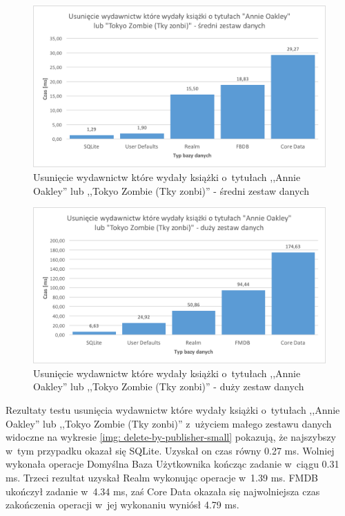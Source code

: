 \begin{figure}[H]
    \centering\includegraphics[width=\linewidth]{img/delete_data/delete_by_publisher/delete_by_publisher_medium_test.png}
    \caption{Usunięcie wydawnictw które wydały książki o~tytułach ,,Annie Oakley'' lub ,,Tokyo Zombie (Tky zonbi)'' - średni zestaw danych}
    \label{img: delete-by-publisher-medium}
\end{figure}

\begin{figure}[H]
    \centering\includegraphics[width=\linewidth]{img/delete_data/delete_by_publisher/delete_by_publisher_big_test.png}
    \caption{Usunięcie wydawnictw które wydały książki o~tytułach ,,Annie Oakley'' lub ,,Tokyo Zombie (Tky zonbi)'' - duży zestaw danych}
    \label{img: delete-by-publisher-big}
\end{figure}

Rezultaty testu usunięcia wydawnictw które wydały książki o~tytułach ,,Annie Oakley'' lub ,,Tokyo Zombie (Tky zonbi)'' z~użyciem małego zestawu danych widoczne na wykresie \ref{img: delete-by-publisher-small} pokazują, że najszybszy w~tym przypadku okazał się SQLite. Uzyskał on czas równy 0.27 ms. Wolniej wykonała operacje Domyślna Baza Użytkownika kończąc zadanie w~ciągu 0.31 ms. Trzeci rezultat uzyskał Realm wykonując operacje w~1.39 ms. FMDB ukończył zadanie w~4.34 ms, zaś Core Data okazała się najwolniejsza czas zakończenia operacji w~jej wykonaniu wyniósł 4.79 ms. 

